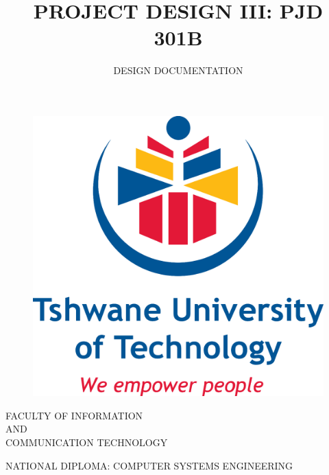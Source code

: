 \documentclass[a4paper,12pt,singlespacing]{article}
\title{PROJECT DESIGN III: PJD 301B}
\author{DESIGN DOCUMENTATION}
\def\emails{e-mail do aluno 1, e-mail do aluno 2, e-mail do aluno 3, e-mail do Orientador, e-mail do Coorientador}
\begin{document}
    {\centering
		\begin{figure}[!ht]
			\centering
			\includegraphics[scale=0.15]{./tut_logo.png}
		\end{figure}

        \setlength{\parskip}{0pt}
		FACULTY OF INFORMATION \\ AND \\  COMMUNICATION TECHNOLOGY

        \setlength{\parskip}{18pt}
		NATIONAL DIPLOMA: COMPUTER SYSTEMS ENGINEERING

        \setlength{\parskip}{18pt}
        \textbf{ \thetitle }
        \setlength{\parskip}{12pt}

        \theauthor

        \setlength{\parskip}{6pt}

    }


    \clearpage  %
    \tableofcontents
    \clearpage  %


    \justifying


    

    

    
\end{document}
